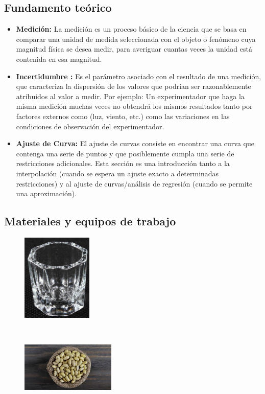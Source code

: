 \documentclass[10pt]{article}
\begin{document}
\subsection{Fundamento teórico}
\begin{itemize}
    \item \textbf{Medición:} La medición es un proceso básico de la ciencia que se basa en comparar
una unidad de medida seleccionada con el objeto o fenómeno cuya magnitud física se
desea medir, para averiguar cuantas veces la unidad está contenida en esa magnitud.
    \item \textbf{Incertidumbre :} Es el parámetro asociado con el resultado de una medición, que
caracteriza la dispersión de los valores que podrían ser razonablemente atribuidos al
valor a medir. Por ejemplo: Un experimentador que haga la misma medición muchas
veces no obtendrá los mismos resultados tanto por factores externos como (luz, viento,
etc.) como las variaciones en las condiciones de observación del experimentador.
\item \textbf{Ajuste de Curva: } El ajuste de curvas consiste en encontrar una curva que contenga
una serie de puntos y que posiblemente cumpla una serie de restricciones adicionales.
Esta sección es una introducción tanto a la interpolación (cuando se espera un ajuste
exacto a determinadas restricciones) y al ajuste de curvas/análisis de regresión (cuando
se permite una aproximación).
\end{itemize}
\subsection{Materiales y equipos de trabajo}

    \begin{figure}[H]
	\begin{center}
 		\includegraphics[width = 0.3\textwidth]{Imagenes/vaso.jpg}
	\end{center} 
    \end{figure}
    \begin{figure}[H]
	\begin{center}
 		\includegraphics[width = 0.4\textwidth]{Imagenes/frijoles.jpeg}
	\end{center} 
    \end{figure}
\end{document}
